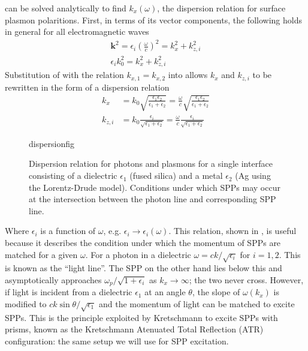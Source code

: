  can be solved analytically to find
$k_x(\omega)$, the dispersion relation for surface plasmon polaritions.
First, in terms of its vector components, the following holds in general
for all electromagnetic waves
\begin{align}
\mathbf{k}^2=\epsilon_i \left(\frac{\omega}{c}\right)^2=k_x^2 + k_{z,i}^2\\
\epsilon_i k_0^2=k_x^2 + k_{z,i}^2
\label{eqn:dispersion1}
\end{align}
Substitution of  with the relation 
$k_{x,1}=k_{x,2}$ into  allows 
$k_x$ and $k_{z,i}$ to be rewritten in the form of a dispersion relation
\begin{align}
k_x &= k_0\sqrt{\frac{\epsilon_1 \epsilon_2}{\epsilon_1+\epsilon_2}} 
= \frac{\omega}{c}\sqrt{\frac{\epsilon_1 \epsilon_2}{\epsilon_1+\epsilon_2}}\\
k_{z,i} &= k_0\frac{\epsilon_i}{\sqrt{\epsilon_1+\epsilon_2}}
= \frac{\omega}{c}\frac{\epsilon_i}{\sqrt{\epsilon_1+\epsilon_2}}
\end{align}

\begin{figure}[ht]
 \centering
{dispersionfig}
\label{fig:dispersionrelation}
\caption{
Dispersion relation for photons and plasmons for a single interface
consisting of a dielectric $\epsilon_1$ (fused silica) and a metal
$\epsilon_2$ (Ag using the Lorentz-Drude model). Conditions
under which SPPs may occur at the intersection between the photon 
line and corresponding SPP line.
}
\end{figure}
Where $\epsilon_i$ is a function of $\omega$, e.g.
$\epsilon_i\to\epsilon_i(\omega)$.  This relation, shown in
, is useful because it describes the
condition under which the momentum of SPPs are matched for a given
$\omega$.  For a photon in a dielectric $\omega = c k /\sqrt{\epsilon_i}$
for $i=1,2$.  This is known as the ``light line''.  The SPP on the other
hand lies below this and asymptotically approaches
$\omega_p/\sqrt{1+\epsilon_i}$ as $k_x\to\infty$; the two never cross.
However, if light is incident from a dielectric $\epsilon_1$ at an angle
$\theta$, the slope of $\omega(k_x)$ is modified to $c k \sin
\theta/\sqrt{\epsilon_1}$ and the momentum of light can be matched to
excite SPPs.  This is the principle exploited by Kretschmann
\cite{kretschmann1968} to excite SPPs with prisms, known as the Kretschmann
Atenuated Total Reflection (ATR) configuration: the same setup we will use
for SPP excitation.

